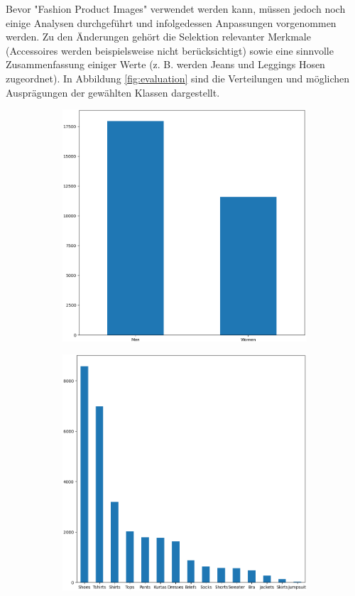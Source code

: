 Bevor "Fashion Product Images" verwendet werden kann, müssen jedoch noch einige Analysen durchgeführt und infolgedessen Anpassungen vorgenommen werden. Zu den Änderungen gehört die Selektion relevanter Merkmale (Accessoires werden beispielsweise nicht berücksichtigt) sowie eine sinnvolle Zusammenfassung einiger Werte (z. B. werden Jeans und Leggings Hosen zugeordnet). In Abbildung \ref{fig:evaluation} sind die Verteilungen und möglichen Ausprägungen der gewählten Klassen dargestellt.

\begin{figure}[H]
	\centering
	\begin{subfigure}[c]{0.32\linewidth}
		\includegraphics[width=\linewidth]{images/gender.png}
	\end{subfigure}
	\begin{subfigure}[c]{0.32\linewidth}
		\includegraphics[width=\linewidth]{images/articleType.png}

\end{subfigure}
\end{figure}
